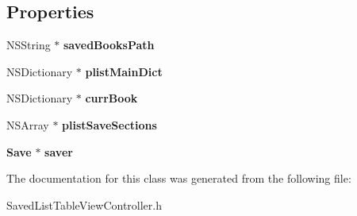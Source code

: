 \subsection*{Properties}
\begin{DoxyCompactItemize}
\item 
N\+S\+String $\ast$ {\bfseries saved\+Books\+Path}\label{interface_saved_list_table_view_controller_a09a8915cb1823999764e52dfa661234c}

\item 
N\+S\+Dictionary $\ast$ {\bfseries plist\+Main\+Dict}\label{interface_saved_list_table_view_controller_a690c66541215851f8153757315f92dc6}

\item 
N\+S\+Dictionary $\ast$ {\bfseries curr\+Book}\label{interface_saved_list_table_view_controller_a9267936e6cbedae16a93f64b2f37912a}

\item 
N\+S\+Array $\ast$ {\bfseries plist\+Save\+Sections}\label{interface_saved_list_table_view_controller_a15911e64ef5023fe4f278081bcb5c7db}

\item 
{\bf Save} $\ast$ {\bfseries saver}\label{interface_saved_list_table_view_controller_a666694532f2b5c88a4a74a7c4fff5fe2}

\end{DoxyCompactItemize}


The documentation for this class was generated from the following file\+:\begin{DoxyCompactItemize}
\item 
Saved\+List\+Table\+View\+Controller.\+h\end{DoxyCompactItemize}

